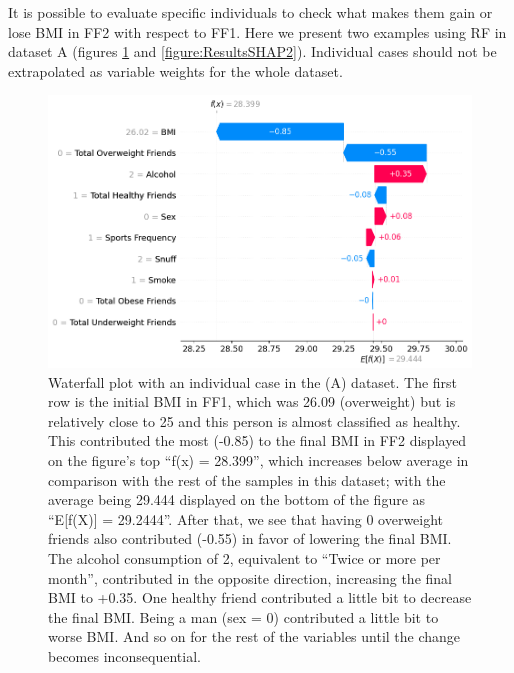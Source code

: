It is possible to evaluate specific individuals to check what makes them gain or lose BMI in FF2 with respect to FF1. Here we present two examples using RF in dataset A (figures \ref{figure:ResultsSHAP1} and  \ref{figure:ResultsSHAP2}). Individual cases should not be extrapolated as variable weights for the whole dataset. 

    \begin{figure}[ht]
        \centering
            \includegraphics[width=0.9\linewidth]{figures/Results/ResultThree/Person Model RFA.png } 
        \caption{Waterfall plot with an individual case in the (A) dataset. The first row is the initial BMI in FF1, which was 26.09 (overweight) but is relatively close to 25 and this person is almost classified as healthy. This contributed the most (-0.85) to the final BMI in FF2 displayed on the figure’s top “f(x) = 28.399”, which increases below average in comparison with the rest of the samples in this dataset; with the average being 29.444 displayed on the bottom of the figure as “E[f(X)] = 29.2444”. After that, we see that having 0 overweight friends also contributed (-0.55) in favor of lowering the final BMI. The alcohol consumption of 2, equivalent to “Twice or more per month”, contributed in the opposite direction, increasing the final BMI to +0.35. One healthy friend contributed a little bit to decrease the final BMI. Being a man (sex = 0) contributed a little bit to worse BMI. And so on for the rest of the variables until the change becomes inconsequential. }
        \label{figure:ResultsSHAP1}
    \end{figure}


